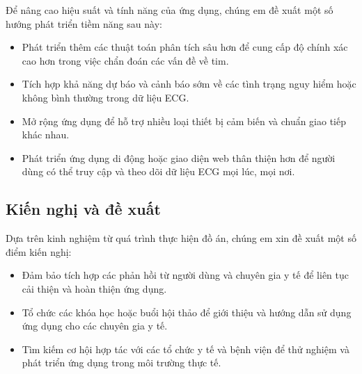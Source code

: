Để nâng cao hiệu suất và tính năng của ứng dụng, chúng em đề xuất một số hướng phát triển tiềm năng sau này:

\begin{adjustwidth}{1.5em}{}
  \begin{itemize}
      \item Phát triển thêm các thuật toán phân tích sâu hơn để cung cấp độ chính xác cao hơn trong việc chẩn đoán các vấn đề về tim.

  
      \item Tích hợp khả năng dự báo và cảnh báo sớm về các tình trạng nguy hiểm hoặc không bình thường trong dữ liệu ECG.

  
      \item Mở rộng ứng dụng để hỗ trợ nhiều loại thiết bị cảm biến và chuẩn giao tiếp khác nhau.

  
      \item  Phát triển ứng dụng di động hoặc giao diện web thân thiện hơn để người dùng có thể truy cập và theo dõi dữ liệu ECG mọi lúc, mọi nơi.

  \end{itemize}
  \end{adjustwidth}


\subsection*{Kiến nghị và đề xuất}


Dựa trên kinh nghiệm từ quá trình thực hiện đồ án, chúng em xin đề xuất một số điểm kiến nghị:

\begin{adjustwidth}{2em}{}
  \begin{itemize}
      \item Đảm bảo tích hợp các phản hồi từ người dùng và chuyên gia y tế để liên tục cải thiện và hoàn thiện ứng dụng.

  
      \item Tổ chức các khóa học hoặc buổi hội thảo để giới thiệu và hướng dẫn sử dụng ứng dụng cho các chuyên gia y tế.

  
      \item Tìm kiếm cơ hội hợp tác với các tổ chức y tế và bệnh viện để thử nghiệm và phát triển ứng dụng trong môi trường thực tế.

    \end{itemize}
  \end{adjustwidth}



\cleardoublepage